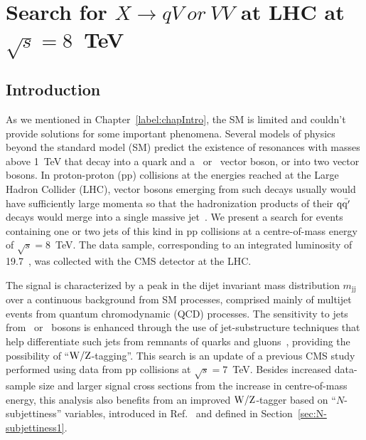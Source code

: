 \chapter{Search for $X \to qV~or~VV$ at LHC at $\sqrt{s}=8$~TeV}
\label{chap:chapter3}
\section{Introduction}
\label{sec:introduction}

As we mentioned in Chapter~\ref{label:chapIntro}, the SM is limited and couldn't
provide solutions for some important phenomena. 
Several models of physics beyond the standard model (SM) predict the
existence of resonances with masses above 1~TeV that decay into a
quark and a \PW\ or \cPZ\ vector boson, or into two vector bosons. In
proton-proton (pp) collisions at the energies reached at the Large Hadron
Collider (LHC), vector bosons emerging from such decays usually would have
sufficiently large momenta so that the hadronization products of their
${\rm q\bar{q'}}$ decays would merge into a single massive
jet~\cite{Gouzevitch:2013qca}. We present a search for events
containing one or two jets of this kind in pp collisions at a
centre-of-mass energy of $\sqrt{s}=8$~TeV.  The data sample,
corresponding to an integrated luminosity of 19.7~\fbinv, was collected
with the CMS detector at the LHC.

The signal is characterized by a peak in the dijet invariant mass
distribution $m_\mathrm{jj}$ over a continuous background from SM
processes, comprised mainly of multijet events from quantum
chromodynamic (QCD) processes. The sensitivity to jets from \PW\ or
\cPZ\ bosons is enhanced through the use of jet-substructure
techniques that help differentiate such jets from remnants of quarks
and gluons~\cite{topwtag_pas,JME-13-006}, providing the possibility of
``${\rm W}/{\rm Z}$-tagging''. This search is an update of a previous CMS
study~\cite{ref_2011} performed using data from pp collisions at
$\sqrt{s}=7$~TeV. Besides increased data-sample size and larger
signal cross sections from the increase in centre-of-mass energy, this
analysis also benefits from an improved ${\rm W}/{\rm Z}$-tagger based on
``$N$-subjettiness'' variables, introduced in
Ref.~\cite{Thaler:2010tr} and defined in Section~\ref{sec:N-subjettiness1}.

